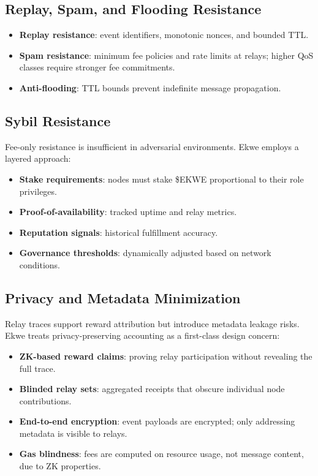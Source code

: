 \documentclass[11pt,a4paper]{article}
\begin{document}
\subsection{Replay, Spam, and Flooding Resistance}
\begin{itemize}[nosep]
  \item \textbf{Replay resistance}: event identifiers, monotonic nonces, and bounded TTL.
  \item \textbf{Spam resistance}: minimum fee policies and rate limits at relays; higher QoS classes require stronger fee commitments.
  \item \textbf{Anti-flooding}: TTL bounds prevent indefinite message propagation.
\end{itemize}

\subsection{Sybil Resistance}
Fee-only resistance is insufficient in adversarial environments. Ekwe employs a layered approach:
\begin{itemize}[nosep]
  \item \textbf{Stake requirements}: nodes must stake \$EKWE proportional to their role privileges.
  \item \textbf{Proof-of-availability}: tracked uptime and relay metrics.
  \item \textbf{Reputation signals}: historical fulfillment accuracy.
  \item \textbf{Governance thresholds}: dynamically adjusted based on network conditions.
\end{itemize}

\subsection{Privacy and Metadata Minimization}
Relay traces support reward attribution but introduce metadata leakage risks. Ekwe treats privacy-preserving accounting as a first-class design concern:
\begin{itemize}[nosep]
  \item \textbf{ZK-based reward claims}: proving relay participation without revealing the full trace.
  \item \textbf{Blinded relay sets}: aggregated receipts that obscure individual node contributions.
  \item \textbf{End-to-end encryption}: event payloads are encrypted; only addressing metadata is visible to relays.
  \item \textbf{Gas blindness}: fees are computed on resource usage, not message content, due to ZK properties.
\end{itemize}
\end{document}
